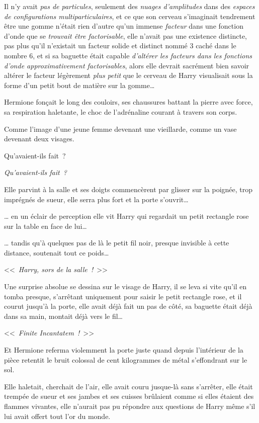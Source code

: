 Il n'y avait \emph{pas de particules}, seulement des \emph{nuages d'amplitudes} dans des \emph{espaces de configurations multiparticulaires}, et ce que son cerveau s'imaginait tendrement être une gomme n'était rien d'autre qu'un immense \emph{facteur} dans une fonction d'onde que se \emph{trouvait être factorisable}, elle n'avait pas une existence distincte, pas plus qu'il n'existait un facteur solide et distinct nommé 3 caché dans le nombre 6, et si sa baguette était capable \emph{d'altérer les facteurs dans les fonctions d'onde approximativement factorisables}, alors elle devrait sacrément bien savoir altérer le facteur légèrement \emph{plus petit} que le cerveau de Harry visualisait sous la forme d'un petit bout de matière sur la gomme…

\later

Hermione fonçait le long des couloirs, ses chaussures battant la pierre avec force, sa respiration haletante, le choc de l'adrénaline courant à travers son corps.

Comme l'image d'une jeune femme devenant une vieillarde, comme un vase devenant deux visages.

Qu'avaient-ils fait~?

\emph{Qu'avaient-ils fait~?}

Elle parvint à la salle et ses doigts commencèrent par glisser sur la poignée, trop imprégnés de sueur, elle serra plus fort et la porte s'ouvrit…

… en un éclair de perception elle vit Harry qui regardait un petit rectangle rose sur la table en face de lui…

… tandis qu'à quelques pas de là le petit fil noir, presque invisible à cette distance, soutenait tout ce poids…

<<~\emph{Harry, sors de la salle~!}~>>

Une surprise absolue se dessina sur le visage de Harry, il se leva si vite qu'il en tomba presque, s'arrêtant uniquement pour saisir le petit rectangle rose, et il courut jusqu'à la porte, elle avait déjà fait un pas de côté, sa baguette était déjà dans sa main, montait déjà vers le fil…

<<~\emph{Finite Incantatem~!}~>>

Et Hermione referma violemment la porte juste quand depuis l'intérieur de la pièce retentit le bruit colossal de cent kilogrammes de métal s'effondrant sur le sol.

Elle haletait, cherchait de l'air, elle avait couru jusque-là sans s'arrêter, elle était trempée de sueur et ses jambes et ses cuisses brûlaient comme si elles étaient des flammes vivantes, elle n'aurait pas pu répondre aux questions de Harry même s'il lui avait offert tout l'or du monde.

